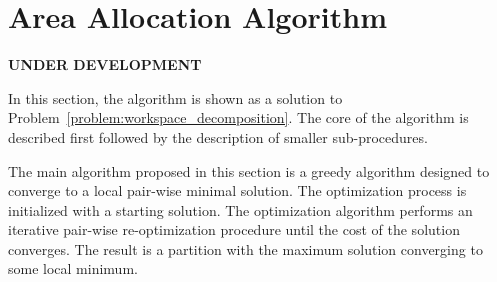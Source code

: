 \documentclass[../main.tex]{subfiles}
\begin{document}
%		








\section{Area Allocation Algorithm}
\label{section:multi_algorithm}
\textbf{UNDER DEVELOPMENT}

In this section, the algorithm is shown as a solution to Problem~\ref{problem:workspace_decomposition}. The core of the algorithm is described first followed by the description of smaller sub-procedures.

The main algorithm proposed in this section is a greedy algorithm designed to converge to a local pair-wise minimal solution. The optimization process is initialized with a starting solution. The optimization algorithm performs an iterative pair-wise re-optimization procedure until the cost of the solution converges. The result is a partition with the maximum solution converging to some local minimum.
\end{document}

